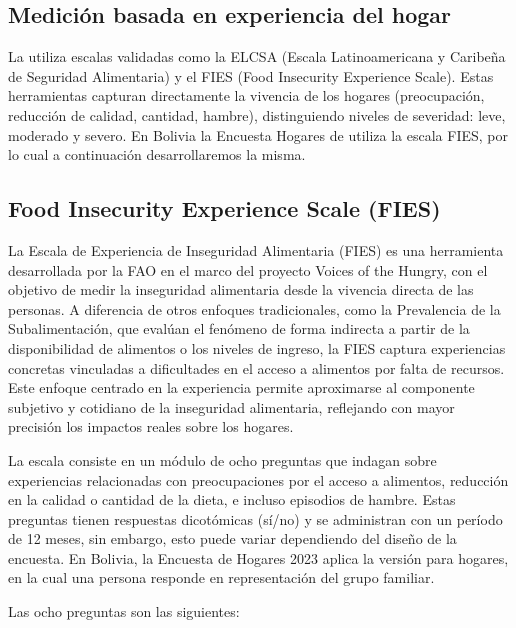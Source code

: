\documentclass[Royal,times,sageh]{sagej}
\begin{document}
\subsection{Medición basada en experiencia del
hogar}\label{mediciuxf3n-basada-en-experiencia-del-hogar}

La \citet{fao2024} utiliza escalas validadas como la ELCSA (Escala
Latinoamericana y Caribeña de Seguridad Alimentaria) y el FIES (Food
Insecurity Experience Scale). Estas herramientas capturan directamente
la vivencia de los hogares (preocupación, reducción de calidad,
cantidad, hambre), distinguiendo niveles de severidad: leve, moderado y
severo. En Bolivia la Encuesta Hogares de \citet{ine2023} utiliza la
escala FIES, por lo cual a continuación desarrollaremos la misma.

\subsection{Food Insecurity Experience Scale
(FIES)}\label{food-insecurity-experience-scale-fies}

La Escala de Experiencia de Inseguridad Alimentaria (FIES) es una
herramienta desarrollada por la FAO en el marco del proyecto Voices of
the Hungry, con el objetivo de medir la inseguridad alimentaria desde la
vivencia directa de las personas. A diferencia de otros enfoques
tradicionales, como la Prevalencia de la Subalimentación, que evalúan el
fenómeno de forma indirecta a partir de la disponibilidad de alimentos o
los niveles de ingreso, la FIES captura experiencias concretas
vinculadas a dificultades en el acceso a alimentos por falta de
recursos. Este enfoque centrado en la experiencia permite aproximarse al
componente subjetivo y cotidiano de la inseguridad alimentaria,
reflejando con mayor precisión los impactos reales sobre los hogares.

La escala consiste en un módulo de ocho preguntas que indagan sobre
experiencias relacionadas con preocupaciones por el acceso a alimentos,
reducción en la calidad o cantidad de la dieta, e incluso episodios de
hambre. Estas preguntas tienen respuestas dicotómicas (sí/no) y se
administran con un período de 12 meses, sin embargo, esto puede variar
dependiendo del diseño de la encuesta. En Bolivia, la Encuesta de
Hogares 2023 aplica la versión para hogares, en la cual una persona
responde en representación del grupo familiar.

Las ocho preguntas son las siguientes:
\end{document}
